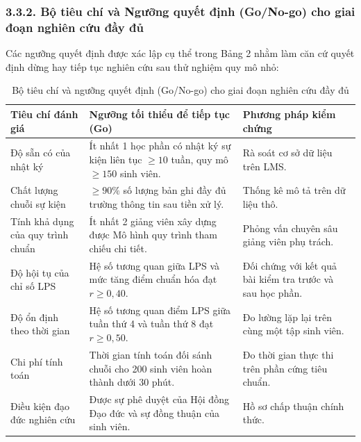 \subsubsection{3.3.2. Bộ tiêu chí và Ngưỡng quyết định (Go/No-go) cho giai đoạn nghiên cứu đầy đủ}
Các ngưỡng quyết định được xác lập cụ thể trong Bảng 2 nhằm làm căn cứ quyết định dừng hay tiếp tục nghiên cứu sau thử nghiệm quy mô nhỏ:

\begin{table}[h!]
\centering
\caption{Bộ tiêu chí và ngưỡng quyết định (Go/No-go) cho giai đoạn nghiên cứu đầy đủ}
\label{tab:gonogo}
\small
\begin{tabular}{>{\raggedright\arraybackslash}p{3.5cm} >{\raggedright\arraybackslash}p{5.5cm} >{\raggedright\arraybackslash}p{4.5cm}}
\toprule
\textbf{Tiêu chí đánh giá} & \textbf{Ngưỡng tối thiểu để tiếp tục (Go)} & \textbf{Phương pháp kiểm chứng} \\
\midrule
Độ sẵn có của nhật ký & Ít nhất 1 học phần có nhật ký sự kiện liên tục $\ge 10$ tuần, quy mô $\ge 150$ sinh viên. & Rà soát cơ sở dữ liệu trên LMS. \\
\addlinespace
Chất lượng chuỗi sự kiện & $\ge 90\%$ số lượng bản ghi đầy đủ trường thông tin sau tiền xử lý. & Thống kê mô tả trên dữ liệu thô. \\
\addlinespace
Tính khả dụng của quy trình chuẩn & Ít nhất 2 giảng viên xây dựng được Mô hình quy trình tham chiếu chi tiết. & Phỏng vấn chuyên sâu giảng viên phụ trách. \\
\addlinespace
Độ hội tụ của chỉ số LPS & Hệ số tương quan giữa LPS và mức tăng điểm chuẩn hóa đạt $r \ge 0{,}40$. & Đối chứng với kết quả bài kiểm tra trước và sau học phần. \\
\addlinespace
Độ ổn định theo thời gian & Hệ số tương quan điểm LPS giữa tuần thứ 4 và tuần thứ 8 đạt $r \ge 0{,}50$. & Đo lường lặp lại trên cùng một tập sinh viên. \\
\addlinespace
Chi phí tính toán & Thời gian tính toán đối sánh chuỗi cho 200 sinh viên hoàn thành dưới 30 phút. & Đo thời gian thực thi trên phần cứng tiêu chuẩn. \\
\addlinespace
Điều kiện đạo đức nghiên cứu & Được sự phê duyệt của Hội đồng Đạo đức và sự đồng thuận của sinh viên. & Hồ sơ chấp thuận chính thức. \\
\bottomrule
\end{tabular}
\end{table}
